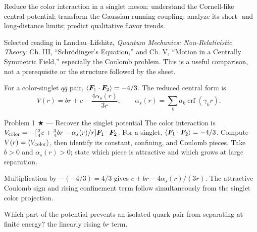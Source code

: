 \documentclass[11pt]{article}
\begin{document}

\begin{goals}
Reduce the color interaction in a singlet meson; understand the Cornell-like
central potential; transform the Gaussian running coupling; analyze its
short- and long-distance limits; predict qualitative flavor trends.
\end{goals}
\begin{reading}
Selected reading in Landau--Lifshitz, \emph{Quantum Mechanics: Non-Relativistic
Theory}: Ch. III, ``Schr\"odinger's Equation,'' and Ch. V, ``Motion in a
Centrally Symmetric Field,'' especially the Coulomb problem. This is a useful
comparison, not a prerequisite or the structure followed by the sheet.
\end{reading}


For a color-singlet $q\bar q$ pair,
$\left\langle \bm F_1\cdot\bm F_2\right\rangle=-4/3$. The reduced central form is
\[
V(r)=br+c-\frac{4\alpha_s(r)}{3r},\qquad
\alpha_s(r)=\sum_k a_k\operatorname{erf}(\gamma_k r).
\]

\begin{problem}{Problem 1 ★ — Recover the singlet potential}
The color interaction is
$V_{\rm color}=-[\tfrac34c+\tfrac34br-\alpha_s(r)/r]\bm F_1\cdot\bm F_2$.
For a singlet, $\left\langle \bm F_1\cdot\bm F_2\right\rangle=-4/3$.
Compute $V(r)=\left\langle V_{\rm color}\right\rangle$, then identify its constant,
confining, and Coulomb pieces. Take $b>0$ and $\alpha_s(r)>0$;
state which piece is attractive and which grows at large separation.
\end{problem}
\begin{solution}
Multiplication by $-(-4/3)=4/3$ gives
$c+br-4\alpha_s(r)/(3r)$. The attractive Coulomb sign and rising confinement
term follow simultaneously from the singlet color projection.
\end{solution}
\begin{quiz}
Which part of the potential prevents an isolated quark pair from separating at
finite energy? \answer the linearly rising $br$ term.
\end{quiz}
\end{document}
